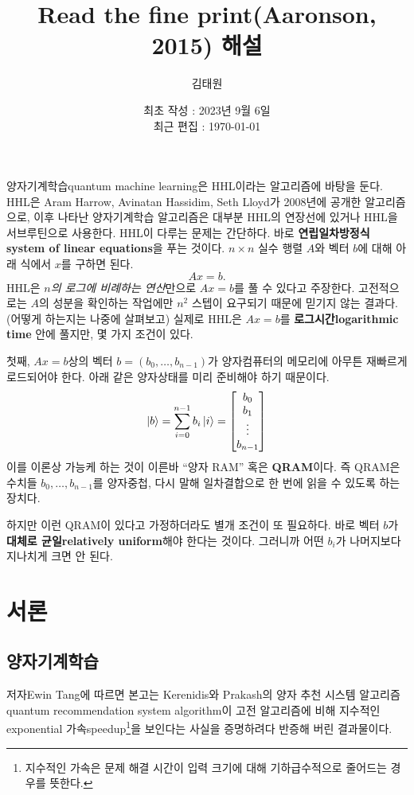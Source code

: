 \documentclass[a4paper,atbegshi,chapter]{oblivoir}
\title{Read the fine print(Aaronson, 2015) 해설}
\author{김태원}
\date{최초 작성 : 2023년 9월 6일\\ 최근 편집 : \today}
\begin{document}
\maketitle
양자기계학습{\tiny quantum machine learning}은 HHL이라는 알고리즘에 바탕을
둔다. HHL은 Aram Harrow, Avinatan Hassidim, Seth Lloyd가 2008년에 공개한
알고리즘으로, 이후 나타난 양자기계학습 알고리즘은 대부분 HHL의 연장선에
있거나 HHL을 서브루틴으로 사용한다. HHL이 다루는 문제는 간단하다. 
바로 \textbf{연립일차방정식\tiny system of linear equations}을 푸는 것이다.
$n\times n$ 실수 행렬 $A$와 벡터 $b$에 대해 아래 식에서 $x$를 구하면 된다.
\[
  Ax=b.
\]
HHL은 \emph{$n$의 로그에 비례하는 연산}만으로 $Ax=b$를 풀 수 있다고 주장한다. 
고전적으로는 $A$의 성분을 확인하는 작업에만 $n^2$ 스텝이 요구되기 때문에
믿기지 않는 결과다. (어떻게 하는지는 나중에 살펴보고) 실제로 HHL은
$Ax=b$를 \textbf{로그시간\footnotesize logarithmic time} 안에 풀지만, 몇
가지 조건이 있다.

첫째, $Ax=b$상의 벡터 $b=(b_0,\ldots,b_{n-1})$가 양자컴퓨터의 메모리에 아무튼
재빠르게 로드되어야 한다. 아래 같은 양자상태를 미리 준비해야 하기 때문이다.
\[
  \ket{b} = \sum_{i=0}^{n-1} b_i\ket{i} = 
  \begin{bmatrix}b_0\\b_1\\\vdots\\b_{n-1}\end{bmatrix}
\]
이를 이론상 가능케 하는 것이 이른바 ``양자 RAM'' 혹은 \textbf{QRAM}이다. 즉 QRAM은
수치들 $b_0,\ldots,b_{n-1}$를 양자중첩, 다시 말해 일차결합으로 한 번에 읽을
수 있도록 하는 장치다. 

하지만 이런 QRAM이 있다고 가정하더라도 별개 조건이 또 필요하다. 바로 벡터 $b$가
\textbf{대체로 균일\footnotesize relatively uniform}해야 한다는 것이다. 그러니까
어떤 $b_i$가 나머지보다 지나치게 크면 안 된다. 

\chapter{서론}
\section{양자기계학습}
저자{\tiny Ewin Tang}에 따르면 본고는 Kerenidis와 Prakash의 양자 추천
시스템 알고리즘{\tiny quantum recommendation system algorithm}이 고전
알고리즘에 비해 지수적인{\tiny exponential} 가속{\tiny speedup}\footnote{지수적인
가속은 문제 해결 시간이 입력 크기에 대해 기하급수적으로 줄어드는 경우를 뜻한다.}을
보인다는 사실을 증명하려다 반증해 버린 결과물이다. 
\end{document}
